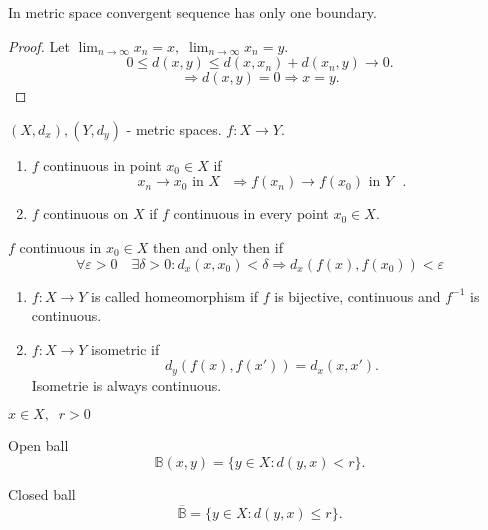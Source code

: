 \begin{theorem}
    In metric space convergent sequence has only one boundary.
\end{theorem}
\begin{proof}
    Let $\lim_{n \to \infty} x_n = x, \; \lim_{n \to \infty} x_n = y $.
    \[
    0 \leq d(x, y) \leq d(x, x_n) + d(x_n, y) \to 0
    .\] 
    \[
    \Rightarrow d(x, y) = 0 \Rightarrow x = y
    .\] 
\end{proof}

$\left( X, d_x \right), \left( Y, d_y \right) $ - metric spaces. $f : X \to Y$.

\begin{definition}
    \begin{enumerate}
        \item $f$ continuous in point $x_0 \in X$ if 
            \[
            x_n \to x_0 \text{ in $X$ } \Rightarrow f(x_n) \to f\left( x_0 \right) \text{ in $Y$ }
            .\] 
        \item $f$ continuous on $X$ if $f$ continuous in every point $x_0 \in X$.
    \end{enumerate}
\end{definition}

\begin{remark}
    $f$ continuous in $x_0 \in X$ then and only then if
    \[\forall \varepsilon > 0 \quad \exists \delta > 0 : d_x(x, x_0) < \delta \Rightarrow d_x(f(x), f(x_0)) < \varepsilon \]
\end{remark}

\begin{definition}
    \begin{enumerate}
        \item $f: X \to Y$ is called homeomorphism if $f$ is bijective, continuous and $f^{-1}$ is continuous.
        \item $f: X \to Y$ isometric if 
            \[
            d_y (f(x), f(x')) = d_x(x, x')
            .\] 
            Isometrie is always continuous.
    \end{enumerate}
\end{definition}

$x \in X, \;\; r > 0$
\begin{definition}
    Open ball \[
    \mathbb{B}(x, y) = \{ y \in X : d(y, x) < r \} 
    .\] 
\end{definition}
\begin{definition}
    Closed ball \[
    \overline{\mathbb{B}} = \{ y \in X : d(y, x) \leq r \} 
    .\] 
\end{definition}

